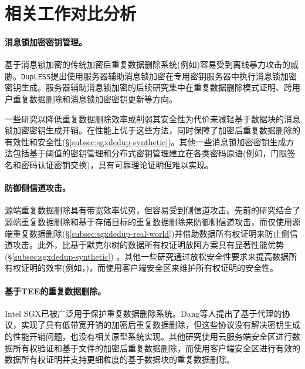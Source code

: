 \section{相关工作对比分析}
\label{sec:sgxdedup-related_work}

\paragraph*{消息锁加密密钥管理。} 基于消息锁加密\cite{bellare2013MLE}的传统加密后重复数据删除系统(例如\cite{adya2002farsite,cox2002pastiche,shah15})容易受到离线暴力攻击\cite{bellare2013DupLESS}的威胁。{\tt DupLESS}\cite{bellare2013DupLESS}提出使用服务器辅助消息锁加密在专用密钥服务器中执行消息锁加密密钥生成。服务器辅助消息锁加密的后续研究集中在重复数据删除模式证明\cite{armknecht2015transparent}、跨用户重复数据删除\cite{zhou2015secdep}和消息锁加密密钥更新\cite{qin17}等方向。

一些研究以降低重复数据删除效率\cite{zhou2015secdep,qin17}或削弱其安全性\cite{li2020Info}为代价来减轻基于数据块的消息锁加密密钥生成开销。\sysnameS 在性能上优于这些方法，同时保障了加密后重复数据删除的有效性和安全性(\S\ref{subsec:sgxdedup-synthetic})。其他一些消息锁加密密钥生成方法包括基于阈值的密钥管理\cite{duan2014distributed}和分布式密钥管理\cite{liu2015secure}建立在各类密码原语(例如，门限签名\cite{duan2014distributed}和密码认证密钥交换\cite{liu2015secure})，具有可靠理论证明但难以实现。

\paragraph*{防御侧信道攻击。}源端重复数据删除具有带宽效率优势，但容易受到侧信道攻击\cite{harnik2010side}。先前的研究\cite{harnik2010side, li15}结合了源端重复数据删除和基于存储目标的重复数据删除来防御侧信道攻击，而\sysnameS 仅使用源端重复数据删除(\S\ref{subsec:sgxdedup-real-world})并借助数据所有权证明来防止侧信道攻击。此外，\sysnameS 比基于默克尔树的数据所有权证明放阿方案具有显著性能优势(\S\ref{subsec:sgxdedup-synthetic}) 。其他一些研究通过放松安全性要求来提高数据所有权证明的效率(例如，\cite{pietro12,xu2013weak})，而\sysnameS 使用客户端安全区来维护所有权证明的安全性。

\paragraph*{基于TEE的重复数据删除。} Intel SGX\cite{sgx}已被广泛用于保护重复数据删除系统。Dang等人\cite{dang2017Privacy}提出了基于代理的协议，实现了具有低带宽开销的加密后重复数据删除，但这些协议没有解决密钥生成的性能开销问题，也没有相关原型系统实现。其他研究使用云服务端安全区进行数据所有权验证\cite{you2020Proofs}和基于文件的加密后重复数据删除\cite{fuhry20}，而\sysnameS 使用客户端安全区进行有效的数据所有权证明并支持更细粒度的基于数据块的重复数据删除。
